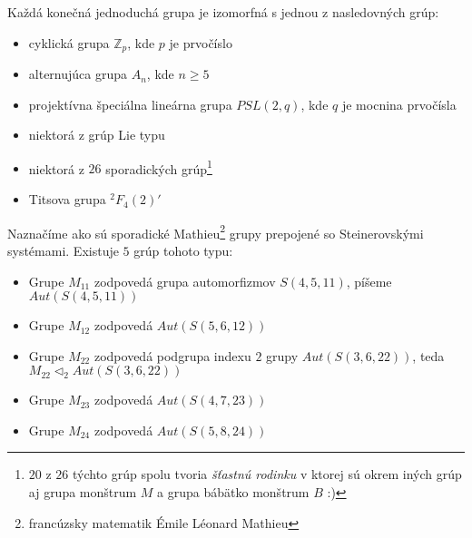 \begin{theorem_hard}
	Každá konečná jednoduchá grupa je izomorfná s jednou z nasledovných grúp:
	\begin{itemize}
		\item cyklická grupa $\mathbb{Z}_p$, kde $p$ je prvočíslo
		\item alternujúca grupa $A_n$, kde $n \geq 5$
		\item projektívna špeciálna lineárna grupa $PSL(2, q)$, kde $q$ je mocnina prvočísla
		\item niektorá z grúp Lie typu
		\item niektorá z $26$ sporadických grúp\footnote{$20$ z $26$ týchto grúp spolu tvoria \textit{šťastnú rodinku} v ktorej sú okrem iných grúp aj grupa monštrum $M$ a grupa bábätko monštrum $B$ :)}
		\item Titsova grupa $^2F_4(2)'$
	\end{itemize}
\end{theorem_hard}

Naznačíme ako sú sporadické Mathieu\footnote{francúzsky matematik Émile Léonard Mathieu} grupy prepojené so Steinerovskými systémami. Existuje $5$ grúp tohoto typu:

\begin{itemize}
	\item Grupe $M_{11}$ zodpovedá grupa automorfizmov $S(4,5,11)$, píšeme $Aut(S(4,5,11))$ 	
	\item Grupe $M_{12}$ zodpovedá $Aut(S(5,6,12))$
	\item Grupe $M_{22}$ zodpovedá podgrupa indexu $2$ grupy $Aut(S(3,6,22))$, teda $M_{22} \triangleleft_2 Aut(S(3,6,22))$
	\item Grupe $M_{23}$ zodpovedá $Aut(S(4,7,23))$
	\item Grupe $M_{24}$ zodpovedá $Aut(S(5,8,24))$
\end{itemize}
